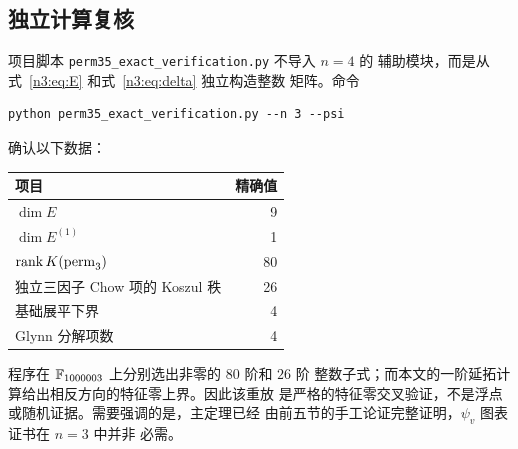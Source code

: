 \subsection{独立计算复核}

项目脚本 \texttt{perm35\_exact\_verification.py} 不导入 \(n=4\) 的
辅助模块，而是从式~\eqref{n3:eq:E} 和式~\eqref{n3:eq:delta} 独立构造整数
矩阵。命令
\begin{verbatim}
python perm35_exact_verification.py --n 3 --psi
\end{verbatim}
确认以下数据：
\begin{center}
\begin{tabular}{@{}lr@{}}
\toprule
项目 & 精确值\\
\midrule
\(\dim E\) & 9\\
\(\dim E^{(1)}\) & 1\\
\(\operatorname{rank} K(\operatorname{perm}_3)\) & 80\\
独立三因子 Chow 项的 Koszul 秩 & 26\\
基础展平下界 & 4\\
Glynn 分解项数 & 4\\
\bottomrule
\end{tabular}
\end{center}
程序在 \(\mathbb F_{1000003}\) 上分别选出非零的 \(80\) 阶和 \(26\) 阶
整数子式；而本文的一阶延拓计算给出相反方向的特征零上界。因此该重放
是严格的特征零交叉验证，不是浮点或随机证据。需要强调的是，主定理已经
由前五节的手工论证完整证明，\(\psi_v\) 图表证书在 \(n=3\) 中并非
必需。
